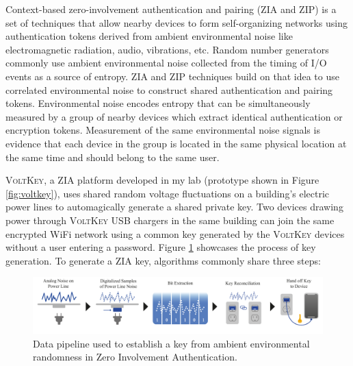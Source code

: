 \documentclass[10pt,onecolumn]{article}
\begin{document}
Context-based zero-involvement authentication and pairing (ZIA and ZIP) is a set of techniques that allow nearby devices to form self-organizing networks using authentication tokens derived from ambient environmental noise like electromagnetic radiation, audio, vibrations, etc.
Random number generators commonly use ambient environmental noise collected from the timing of I/O events as a source of entropy.
ZIA and ZIP techniques build on that idea to use correlated environmental noise to construct shared authentication and pairing tokens.
Environmental noise encodes entropy that can be simultaneously measured by a group of nearby devices which extract identical authentication or encryption tokens.
Measurement of the same environmental noise signals is evidence that each device in the group is located in the same physical location at the same time and should belong to the same user.


\textsc{VoltKey}, a ZIA platform developed in my lab (prototype shown in Figure \ref{fig:voltkey}), uses shared random voltage fluctuations on a building's electric power lines to automagically generate a shared private key.
Two devices drawing power through \textsc{VoltKey} USB chargers in the same building can join the same encrypted WiFi network using a common key generated by the \textsc{VoltKey} devices without a user entering a password.
Figure \ref{fig:pipeline} showcases the process of key generation.
To generate a ZIA key, algorithms commonly share three steps:

\begin{figure}
\includegraphics[width=\hsize]{figures/datapipeline.pdf}
\caption{Data pipeline used to establish a key from ambient environmental randomness in Zero Involvement Authentication.}
\label{fig:pipeline}
\end{figure}
\end{document}
